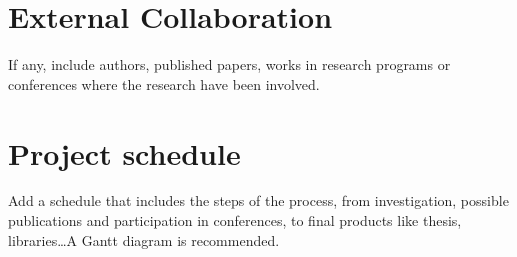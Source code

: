 \documentclass[
  11pt,
  a4paper,
  oneside
]{article}
\begin{document}
\section{External Collaboration}

If any, include authors, published papers, works in research programs or conferences where the research have been involved.

\section{Project schedule}
Add a schedule that includes the steps of the process, from investigation, possible publications and participation in conferences, to final products like thesis, libraries\ldots A Gantt diagram is recommended.



\end{document}
